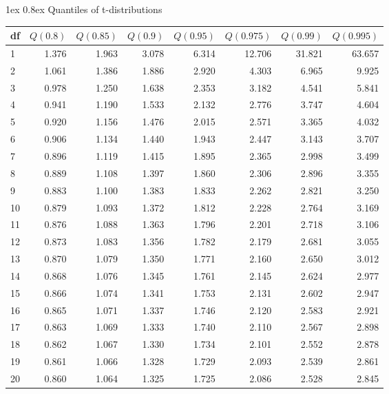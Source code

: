 \documentclass[10pt,landscape]{article}
\makeatletter
\renewcommand{\subsection}{\@startsection{subsection}{2}{0mm}%
                                {1ex} %
                                {0.8ex} %
                                {\normalfont\normalsize\bfseries}}
\makeatother
\begin{document}
\begin{multicols}{2}
\subsection{Quantiles of t-distributions}
\begin{tabular}{lrrrrrrr} \hline df & $Q(0.8)$ & $Q(0.85)$ & $Q(0.9)$ & $Q(0.95)$ & $Q(0.975)$ & $Q(0.99)$ & $Q(0.995)$ \\ \hline 1 & 1.376 & 1.963 & 3.078 & 6.314 & 12.706 & 31.821 & 63.657 \\ 2 & 1.061 & 1.386 & 1.886 & 2.920 & 4.303 & 6.965 & 9.925 \\ 3 & 0.978 & 1.250 & 1.638 & 2.353 & 3.182 & 4.541 & 5.841 \\ 4 & 0.941 & 1.190 & 1.533 & 2.132 & 2.776 & 3.747 & 4.604 \\ 5 & 0.920 & 1.156 & 1.476 & 2.015 & 2.571 & 3.365 & 4.032 \\ 6 & 0.906 & 1.134 & 1.440 & 1.943 & 2.447 & 3.143 & 3.707 \\ 7 & 0.896 & 1.119 & 1.415 & 1.895 & 2.365 & 2.998 & 3.499 \\ 8 & 0.889 & 1.108 & 1.397 & 1.860 & 2.306 & 2.896 & 3.355 \\ 9 & 0.883 & 1.100 & 1.383 & 1.833 & 2.262 & 2.821 & 3.250 \\ 10 & 0.879 & 1.093 & 1.372 & 1.812 & 2.228 & 2.764 & 3.169 \\ 11 & 0.876 & 1.088 & 1.363 & 1.796 & 2.201 & 2.718 & 3.106 \\ 12 & 0.873 & 1.083 & 1.356 & 1.782 & 2.179 & 2.681 & 3.055 \\ 13 & 0.870 & 1.079 & 1.350 & 1.771 & 2.160 & 2.650 & 3.012 \\ 14 & 0.868 & 1.076 & 1.345 & 1.761 & 2.145 & 2.624 & 2.977 \\ 15 & 0.866 & 1.074 & 1.341 & 1.753 & 2.131 & 2.602 & 2.947 \\ 16 & 0.865 & 1.071 & 1.337 & 1.746 & 2.120 & 2.583 & 2.921 \\ 17 & 0.863 & 1.069 & 1.333 & 1.740 & 2.110 & 2.567 & 2.898 \\ 18 & 0.862 & 1.067 & 1.330 & 1.734 & 2.101 & 2.552 & 2.878 \\ 19 & 0.861 & 1.066 & 1.328 & 1.729 & 2.093 & 2.539 & 2.861 \\ 20 & 0.860 & 1.064 & 1.325 & 1.725 & 2.086 & 2.528 & 2.845 \\ \hline \end{tabular}

\end{multicols}
\end{document}

